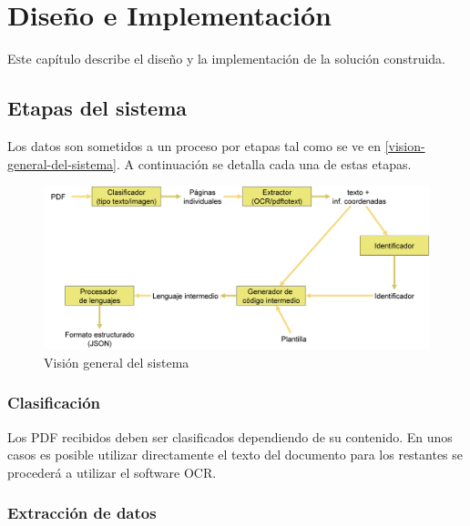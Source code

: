 
\chapter{Diseño e Implementación}
\label{chap:implemetación}

\lettrine{E}ste capítulo describe el diseño y la implementación de la solución construida. 

\section{Etapas del sistema}

Los datos son sometidos a un proceso por etapas tal como se ve en \ref{vision-general-del-sistema}. A continuación se detalla cada una de estas etapas.

\begin{figure}[hp!]
    \centering
    \includegraphics[width=1.0\textwidth]{imaxes/h-implementacion/vision-general-del-sistema}
    \caption{Visión general del sistema}
    \label{fig:vision-general-del-sistema}
\end{figure}

\subsection{Clasificación}

Los PDF recibidos deben ser clasificados dependiendo de su contenido. En unos casos es posible utilizar directamente el texto del documento para los restantes se procederá a utilizar el software OCR.



\subsection{Extracción de datos}

